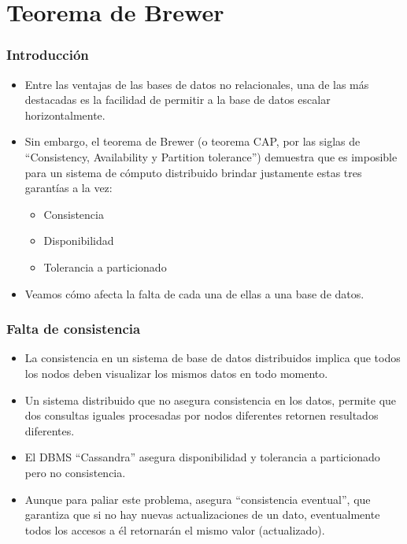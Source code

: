 \section{Teorema de Brewer}

\begin{frame}
\frametitle{Introducción}
\begin{itemize}

\item	Entre las ventajas de las bases de datos no relacionales, una de las más destacadas es la facilidad de permitir a la base de datos escalar horizontalmente. \pause

\item	Sin embargo, el teorema de Brewer (o teorema CAP, por las siglas de ``Consistency, Availability y Partition tolerance'') demuestra que es imposible para un sistema de cómputo distribuido brindar justamente estas tres garantías a la vez:
		\begin{itemize}
			\item	Consistencia
			\item	Disponibilidad
			\item	Tolerancia a particionado
		\end{itemize}
		\pause
\item	Veamos cómo afecta la falta de cada una de ellas a una base de datos.

\end{itemize}
\end{frame}

\begin{frame}
\frametitle{Falta de consistencia}
\begin{itemize}

	\item	La consistencia en un sistema de base de datos distribuidos implica que todos los nodos deben visualizar los mismos datos en todo momento. \pause
	\item	Un sistema distribuido que no asegura consistencia en los datos, permite que dos consultas iguales procesadas por nodos diferentes retornen resultados diferentes. \pause
	\item	El DBMS ``Cassandra'' asegura disponibilidad y tolerancia a particionado pero no consistencia. \pause
	\item	Aunque para paliar este problema, asegura ``consistencia eventual'', que garantiza que si no hay nuevas actualizaciones de un dato, eventualmente todos los accesos a él retornarán el mismo valor (actualizado).

\end{itemize}
\end{frame}

